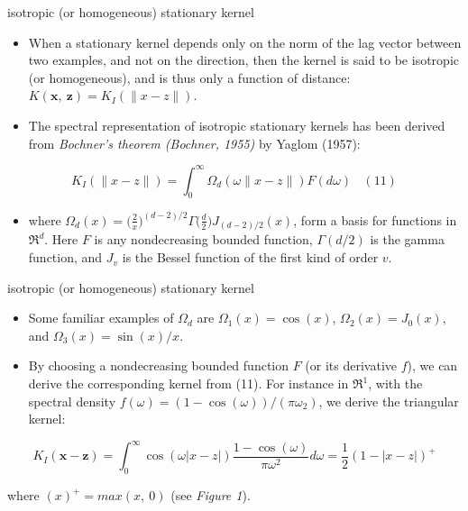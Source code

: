 \documentclass[
  ignorenonframetext,
]{beamer}
\providecommand{\tightlist}{%
  \setlength{\itemsep}{0pt}\setlength{\parskip}{0pt}}
\begin{document}
\begin{frame}{isotropic (or homogeneous) stationary kernel}
\protect\hypertarget{isotropic-or-homogeneous-stationary-kernel}{}
\begin{itemize}
\item
  When a stationary kernel depends only on the norm of the lag vector
  between two examples, and not on the direction, then the kernel is
  said to be isotropic (or homogeneous), and is thus only a function of
  distance: \(K(\pmb x,\ \pmb z) = K_I(\|x - z\|)\).
\item
  The spectral representation of isotropic stationary kernels has been
  derived from \emph{Bochner's theorem (Bochner, 1955)} by Yaglom
  (1957):
\end{itemize}

\[
K_I(\|x - z\|) = \int_0^\infty \Omega_d (\omega\|x - z\|)F(d\omega) \ \ \ \ (11)
\]

\begin{itemize}
\tightlist
\item
  where
  \(\Omega_d(x) = \Big({\frac 2 x}\Big)^{(d-2)/2} \Gamma \Big({\frac d 2}\Big) J_{(d-2)/2}(x)\),
  form a basis for functions in \(\mathfrak R^d\). Here \(F\) is any
  nondecreasing bounded function, \(\Gamma(d/2)\) is the gamma function,
  and \(J_v\) is the Bessel function of the first kind of order \(v\).
\end{itemize}
\end{frame}

\begin{frame}{isotropic (or homogeneous) stationary kernel}
\protect\hypertarget{isotropic-or-homogeneous-stationary-kernel-1}{}
\begin{itemize}
\item
  Some familiar examples of \(\Omega_d\) are \(\Omega_1(x) = \cos(x)\),
  \(\Omega_2(x) = J_0(x)\), and \(\Omega_3(x) = \sin(x)/x\).
\item
  By choosing a nondecreasing bounded function \(F\) (or its derivative
  \(f\)), we can derive the corresponding kernel from (11). For instance
  in \(\mathfrak R^1\), with the spectral density
  \(f(\omega) = (1 - \cos(\omega))/(\pi \omega_2)\), we derive the
  triangular kernel:
\end{itemize}

\[
K_I(\pmb x - \pmb z) = \int_0^\infty \cos(\omega|x - z|) \frac {1 - \cos(\omega)} {\pi \omega^2} d\omega = {\frac 1 2} (1 - |x - z|)^+
\]

where \((x)^+ = max(x,\ 0)\) (see \emph{Figure 1}).
\end{frame}
\end{document}
